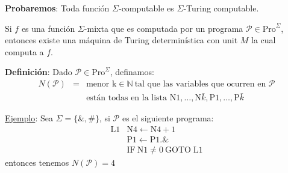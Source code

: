 \begin{frame}
	\textbf{Probaremos}: Toda función $\Sigma$-computable es $\Sigma$-Turing computable.

	\vspace{3mm}
	\PN Si $f$ es una función $\Sigma$-mixta que es computada por un programa $\mathcal{P} \in
	\mathrm{Pro}^{\Sigma}$, entonces existe una máquina de Turing determinística con unit $M$ la cual computa a $f$.

	\vspace{3mm}
	\textbf{Definición}: Dado $\mathcal{P} \in \mathrm{Pro}^{\Sigma}$, definamos:
	\begin{eqnarray*}
		N(\mathcal{P}) &=& \text{menor k} \in \mathbb{N}\ \text{tal que las variables que ocurren en } \mathcal{P} \\
		&& \text{están todas en la lista N}1, \dotsc, \mathrm{N}\bar{k}, \mathrm{P}1, \dotsc, \mathrm{P}\bar{k}
	\end{eqnarray*}

	\PN \underline{Ejemplo}: Sea $\Sigma = \{\&,\#\}$, si $\mathcal{P}$ es el siguiente programa:
	\begin{equation*}
		\begin{array}{ll}
			\mathrm{L}1 & \mathrm{N}4\leftarrow \mathrm{N}4+1 \\
			& \mathrm{P}1\leftarrow \mathrm{P}1.\& \\
			& \mathrm{IF\ N}1\neq 0\ \mathrm{GOTO}\;\mathrm{L}1
		\end{array}
	\end{equation*}
	entonces tenemos $N(\mathcal{P})=4$
\end{frame}
